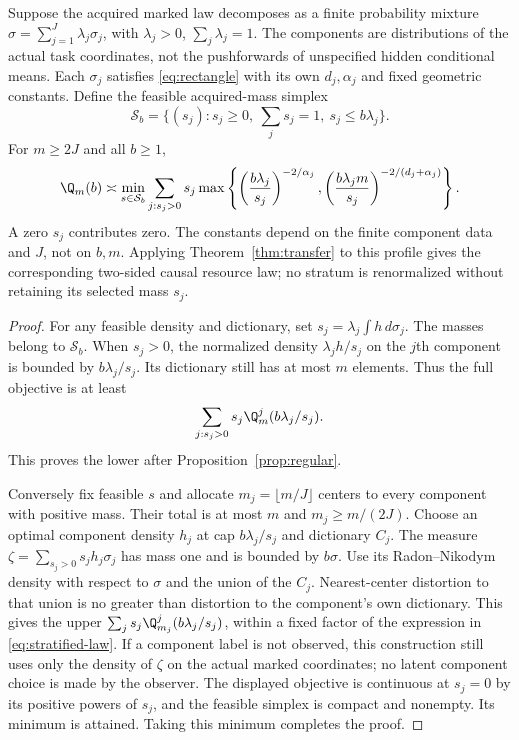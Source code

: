 \begin{theorem}\label{thm:stratified}
Suppose the acquired marked law decomposes as a finite probability mixture
$\sigma=\sum_{j=1}^J\lambda_j\sigma_j$, with $\lambda_j>0$, $\sum_j\lambda_j=1$. The components are distributions of the actual task coordinates, not the pushforwards of unspecified hidden conditional means. Each $\sigma_j$ satisfies \eqref{eq:rectangle} with its own $d_j,\alpha_j$ and fixed geometric constants. Define the feasible acquired-mass simplex
\[
 \mathcal S_b=\{(s_j):s_j\ge0,\ \sum_js_j=1,\ s_j\le b\lambda_j\}.
\]
For $m\ge2J$ and all $b\ge1$,
\begin{equation}\label{eq:stratified-law}
 \Q_m(b)\asymp\min_{s\in\mathcal S_b}
 \sum_{j:s_j>0}s_j
 \max\left\{
 \left(\frac{b\lambda_j}{s_j}\right)^{-2/\alpha_j},
 \left(\frac{b\lambda_jm}{s_j}\right)^{-2/(d_j+\alpha_j)}\right\}.
\end{equation}
A zero $s_j$ contributes zero. The constants depend on the finite component data and $J$, not on $b,m$. Applying Theorem~\ref{thm:transfer} to this profile gives the corresponding two-sided causal resource law; no stratum is renormalized without retaining its selected mass $s_j$.
\end{theorem}
\begin{proof}
For any feasible density and dictionary, set $s_j=\lambda_j\int h\,d\sigma_j$. The masses belong to $\mathcal S_b$. When $s_j>0$, the normalized density $\lambda_jh/s_j$ on the $j$th component is bounded by $b\lambda_j/s_j$. Its dictionary still has at most $m$ elements. Thus the full objective is at least
\[
 \sum_{j:s_j>0}s_j\Q_m^j(b\lambda_j/s_j).
\]
This proves the lower after Proposition~\ref{prop:regular}.

Conversely fix feasible $s$ and allocate $m_j=\lfloor m/J\rfloor$ centers to every component with positive mass. Their total is at most $m$ and $m_j\ge m/(2J)$. Choose an optimal component density $h_j$ at cap $b\lambda_j/s_j$ and dictionary $C_j$. The measure $\zeta=\sum_{s_j>0}s_jh_j\sigma_j$ has mass one and is bounded by $b\sigma$. Use its Radon--Nikodym density with respect to $\sigma$ and the union of the $C_j$. Nearest-center distortion to that union is no greater than distortion to the component's own dictionary. This gives the upper $\sum_js_j\Q_{m_j}^j(b\lambda_j/s_j)$, within a fixed factor of the expression in \eqref{eq:stratified-law}. If a component label is not observed, this construction still uses only the density of $\zeta$ on the actual marked coordinates; no latent component choice is made by the observer. The displayed objective is continuous at $s_j=0$ by its positive powers of $s_j$, and the feasible simplex is compact and nonempty. Its minimum is attained. Taking this minimum completes the proof.
\end{proof}


